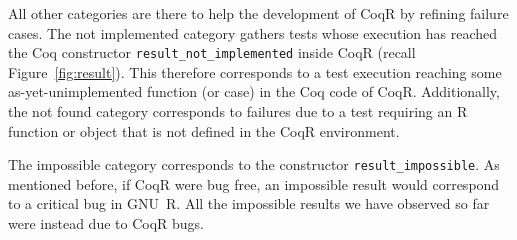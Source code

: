\documentclass[
    sigplan,
    10pt,
    review, %
    natbib=false %
 ]{acmart}
\newcommand\td[1]{\todo[color=green!20,size=\scriptsize]{#1}}
\newcommand\CoqR{CoqR}
\newcommand\newtext[1]{{\color{blue} #1}}
\begin{document}
All other categories are there to help the development of \CoqR{} by refining failure cases. \newtext{The \textsf{not implemented} category gathers tests whose execution has reached the Coq constructor \texttt{result_not_implemented} inside \CoqR{} (recall Figure~\ref{fig:result}). This therefore corresponds to a test execution reaching some as-yet-unimplemented function (or case) in the Coq code of \CoqR{}. Additionally, 
the \textsf{not found} category corresponds to failures due to a test requiring an R function or object that is not defined in the \CoqR{} environment.}

The \textsf{impossible} category corresponds to the constructor \texttt{result_impossible}. As mentioned before, if \CoqR{} were bug free, an impossible result would correspond to a critical bug in GNU~R. All the \textsf{impossible} results we have observed so far were instead due to \CoqR{} bugs.



\end{document}
